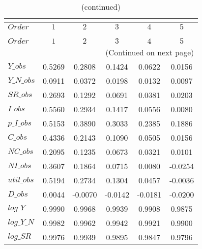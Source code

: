  
\begin{center}
\begin{longtable}{lccccc} 
\caption{COEFFICIENTS OF AUTOCORRELATION}\\
 \label{Table:th_autocorr_matrix}\\
\toprule 
$Order      $	 & 	 $         1$	 & 	 $         2$	 & 	 $         3$	 & 	 $         4$	 & 	 $         5$\\
\midrule \endfirsthead 
\caption{(continued)}\\
 \toprule \\ 
$Order      $	 & 	 $         1$	 & 	 $         2$	 & 	 $         3$	 & 	 $         4$	 & 	 $         5$\\
\midrule \endhead 
\midrule \multicolumn{6}{r}{(Continued on next page)} \\ \bottomrule \endfoot 
\bottomrule \endlastfoot 
$Y\_obs     $	 & 	    0.5269	 & 	    0.2808	 & 	    0.1424	 & 	    0.0622	 & 	    0.0156 \\ 
$Y\_N\_obs  $	 & 	    0.0911	 & 	    0.0372	 & 	    0.0198	 & 	    0.0132	 & 	    0.0097 \\ 
$SR\_obs    $	 & 	    0.2693	 & 	    0.1292	 & 	    0.0691	 & 	    0.0381	 & 	    0.0203 \\ 
$I\_obs     $	 & 	    0.5560	 & 	    0.2934	 & 	    0.1417	 & 	    0.0556	 & 	    0.0080 \\ 
$p\_I\_obs  $	 & 	    0.5153	 & 	    0.3890	 & 	    0.3033	 & 	    0.2385	 & 	    0.1886 \\ 
$C\_obs     $	 & 	    0.4336	 & 	    0.2143	 & 	    0.1090	 & 	    0.0505	 & 	    0.0156 \\ 
$NC\_obs    $	 & 	    0.2095	 & 	    0.1235	 & 	    0.0673	 & 	    0.0321	 & 	    0.0101 \\ 
$NI\_obs    $	 & 	    0.3607	 & 	    0.1864	 & 	    0.0715	 & 	    0.0080	 & 	   -0.0254 \\ 
$util\_obs  $	 & 	    0.5194	 & 	    0.2734	 & 	    0.1304	 & 	    0.0457	 & 	   -0.0036 \\ 
$D\_obs     $	 & 	    0.0044	 & 	   -0.0070	 & 	   -0.0142	 & 	   -0.0181	 & 	   -0.0200 \\ 
$log\_Y     $	 & 	    0.9990	 & 	    0.9968	 & 	    0.9939	 & 	    0.9908	 & 	    0.9875 \\ 
$log\_Y\_N  $	 & 	    0.9982	 & 	    0.9962	 & 	    0.9942	 & 	    0.9921	 & 	    0.9900 \\ 
$log\_SR    $	 & 	    0.9976	 & 	    0.9939	 & 	    0.9895	 & 	    0.9847	 & 	    0.9796 \\ 

\end{longtable}
\end{center}
